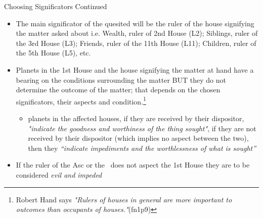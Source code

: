 \begin{frame}[t]{Choosing Significators Continued}
\begin{itemize}
\item The main significator of the quesited will be the ruler of the house signifying the matter asked about i.e.  Wealth, ruler of 2nd House (L2); Siblings, ruler of the 3rd House (L3); Friends, ruler of the 11th House (L11); Children, ruler of the 5th House (L5), etc.
\item Planets in the 1st House and the house signifying the matter at hand have a bearing on the conditions surrounding the matter BUT they do not determine the outcome of the matter; that depends on the chosen significators, their aspects and condition.\footnote{Robert Hand says \textsl{"Rulers of houses in general are more important to outcomes than occupants of houses."}(fn1p9)}
	\begin{itemize}
		\item planets in the affected houses, if they are received by their dispositor, \textsl{"indicate the goodness and worthiness of the thing sought"}, if they are not received by their dispositor (which implies no aspect between the two), then they \textsl{``indicate impediments and the worthlessness of what is sought''}
	\end{itemize}
\item If the ruler of the Asc or the \Moon\ does not aspect the 1st House they are to be considered \textsl{evil and impeded}
\end{itemize}

\end{frame}